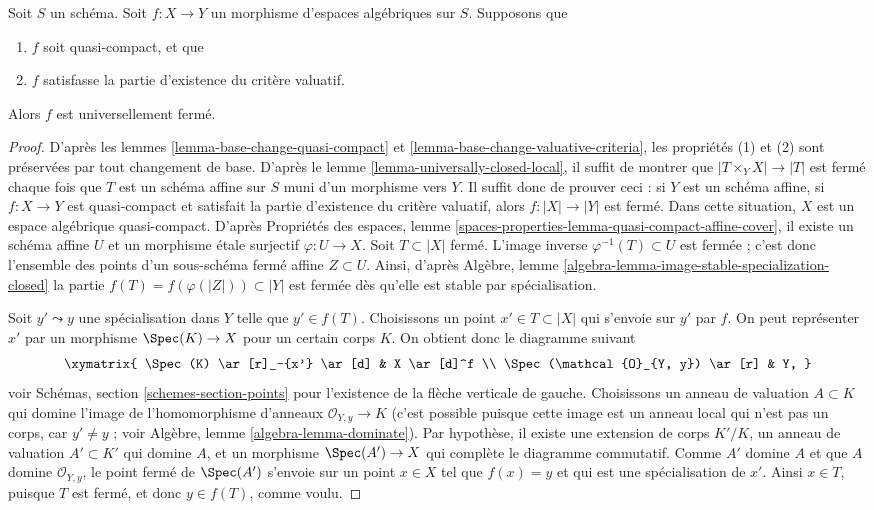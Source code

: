 \begin{lemma}
\label{lemma-quasi-compact-existence-universally-closed}
Soit $S$ un schéma.
Soit $f : X \to Y$ un morphisme d'espaces algébriques sur $S$.
Supposons que
\begin{enumerate}
\item $f$ soit quasi-compact, et que
\item $f$ satisfasse la partie d'existence du critère valuatif.
\end{enumerate}
Alors $f$ est universellement fermé.
\end{lemma}

\begin{proof}
D'après les lemmes \ref{lemma-base-change-quasi-compact}
et \ref{lemma-base-change-valuative-criteria},
les propriétés (1) et (2) sont préservées par
tout changement de base. D'après le lemme \ref{lemma-universally-closed-local},
il suffit de montrer que $|T \times_Y X| \to |T|$ est fermé
chaque fois que $T$ est un schéma affine sur $S$ muni d'un morphisme vers $Y$. Il
suffit donc de prouver ceci : si $Y$ est un schéma affine, si $f : X \to Y$ est quasi-compact
et satisfait la partie d'existence du critère valuatif, alors
$f : |X| \to |Y|$ est fermé. Dans cette situation, $X$ est un espace
algébrique quasi-compact. D'après
Propriétés des espaces,
lemme \ref{spaces-properties-lemma-quasi-compact-affine-cover},
il existe un schéma affine $U$ et un morphisme étale surjectif
$\varphi : U \to X$. Soit $T \subset |X|$ fermé. L'image inverse
$\varphi^{-1}(T) \subset U$ est fermée ; c'est donc l'ensemble des points
d'un sous-schéma fermé affine $Z \subset U$. Ainsi, d'après
Algèbre, lemme \ref{algebra-lemma-image-stable-specialization-closed}
la partie $f(T) = f(\varphi(|Z|)) \subset |Y|$ est fermée dès qu'elle est
stable par spécialisation.

\medskip\noindent
Soit $y' \leadsto y$ une spécialisation dans $Y$ telle que $y' \in f(T)$.
Choisissons un point $x' \in T \subset |X|$ qui s'envoie sur $y'$ par $f$.
On peut représenter $x'$ par un morphisme $\Spec(K) \to X$
pour un certain corps $K$. On obtient donc le diagramme suivant
$$
\xymatrix{
\Spec(K) \ar[r]_-{x'} \ar[d] & X \ar[d]^f \\
\Spec(\mathcal{O}_{Y, y}) \ar[r] & Y,
}
$$
voir
Schémas, section \ref{schemes-section-points}
pour l'existence de la flèche verticale de gauche.
Choisissons un anneau de valuation $A \subset K$ qui domine l'image de
l'homomorphisme d'anneaux $\mathcal{O}_{Y, y} \to K$ (c'est possible puisque
cette image est un anneau local qui n'est pas un corps, car $y' \not = y$ ; voir
Algèbre, lemme \ref{algebra-lemma-dominate}).
Par hypothèse, il existe une extension de corps $K'/K$, un
anneau de valuation $A' \subset K'$ qui domine $A$, et un morphisme
$\Spec(A') \to X$ qui complète le diagramme commutatif.
Comme $A'$ domine $A$ et que $A$ domine $\mathcal{O}_{Y, y}$,
le point fermé de $\Spec(A')$ s'envoie sur
un point $x \in X$ tel que $f(x) = y$ et qui est une spécialisation de $x'$.
Ainsi $x \in T$, puisque $T$ est fermé, et donc $y \in f(T)$, comme voulu.
\end{proof}

